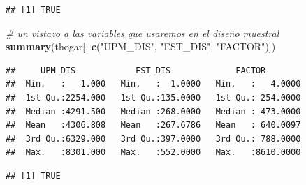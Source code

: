 \documentclass[
]{article}
\newenvironment{Shaded}{\begin{snugshade}}{\end{snugshade}}
\newcommand{\CommentTok}[1]{\textcolor[rgb]{0.56,0.35,0.01}{\textit{#1}}}
\newcommand{\DecValTok}[1]{\textcolor[rgb]{0.00,0.00,0.81}{#1}}
\newcommand{\KeywordTok}[1]{\textcolor[rgb]{0.13,0.29,0.53}{\textbf{#1}}}
\newcommand{\NormalTok}[1]{#1}
\newcommand{\OperatorTok}[1]{\textcolor[rgb]{0.81,0.36,0.00}{\textbf{#1}}}
\newcommand{\StringTok}[1]{\textcolor[rgb]{0.31,0.60,0.02}{#1}}
\begin{document}
\begin{verbatim}
## [1] TRUE
\end{verbatim}

\begin{Shaded}
\begin{Highlighting}[]
\CommentTok{# un vistazo a las variables que usaremos en el diseño muestral}
\KeywordTok{summary}\NormalTok{(thogar[, }\KeywordTok{c}\NormalTok{(}\StringTok{"UPM_DIS"}\NormalTok{, }\StringTok{"EST_DIS"}\NormalTok{, }\StringTok{"FACTOR"}\NormalTok{)])}
\end{Highlighting}
\end{Shaded}

\begin{verbatim}
##     UPM_DIS            EST_DIS             FACTOR         
##  Min.   :   1.000   Min.   :  1.0000   Min.   :   4.0000  
##  1st Qu.:2254.000   1st Qu.:135.0000   1st Qu.: 254.0000  
##  Median :4291.500   Median :268.0000   Median : 473.0000  
##  Mean   :4306.808   Mean   :267.6786   Mean   : 640.0097  
##  3rd Qu.:6329.000   3rd Qu.:397.0000   3rd Qu.: 788.0000  
##  Max.   :8301.000   Max.   :552.0000   Max.   :8610.0000
\end{verbatim}

\begin{Shaded}
\end{Shaded}

\begin{verbatim}
## [1] TRUE
\end{verbatim}
\end{document}
